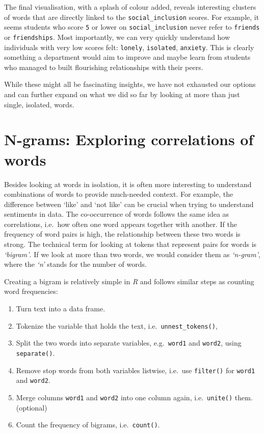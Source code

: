 \documentclass[
  letterpaper,
]{krantz}
\providecommand{\tightlist}{%
  \setlength{\itemsep}{0pt}\setlength{\parskip}{0pt}}\usepackage{longtable,booktabs,array}
\begin{document}
The final visualisation, with a splash of colour added, reveals
interesting clusters of words that are directly linked to the
\texttt{social\_inclusion} scores. For example, it seems students who
score \texttt{5} or lower on \texttt{social\_inclusion} never refer to
\texttt{friends} or \texttt{friendships}. Most importantly, we can very
quickly understand how individuals with very low scores felt:
\texttt{lonely}, \texttt{isolated}, \texttt{anxiety}. This is clearly
something a department would aim to improve and maybe learn from
students who managed to built flourishing relationships with their
peers.

While these might all be fascinating insights, we have not exhausted our
options and can further expand on what we did so far by looking at more
than just single, isolated, words.

\section{N-grams: Exploring correlations of words}\label{sec-n-grams}

Besides looking at words in isolation, it is often more interesting to
understand combinations of words to provide much-needed context. For
example, the difference between `like' and `not like' can be crucial
when trying to understand sentiments in data. The co-occurrence of words
follows the same idea as correlations, i.e.~how often one word appears
together with another. If the frequency of word pairs is high, the
relationship between these two words is strong. The technical term for
looking at tokens that represent pairs for words is \emph{`bigram'}. If
we look at more than two words, we would consider them as
\emph{`n-gram'}, where the \emph{`n'} stands for the number of words.

Creating a bigram is relatively simple in \emph{R} and follows similar
steps as counting word frequencies:

\begin{enumerate}
\def\labelenumi{\arabic{enumi}.}
\tightlist
\item
  Turn text into a data frame.
\item
  Tokenize the variable that holds the text,
  i.e.~\texttt{unnest\_tokens()},
\item
  Split the two words into separate variables, e.g.~\texttt{word1} and
  \texttt{word2}, using \texttt{separate()}.
\item
  Remove stop words from both variables listwise, i.e.~use
  \texttt{filter()} for \texttt{word1} and \texttt{word2}.
\item
  Merge columns \texttt{word1} and \texttt{word2} into one column again,
  i.e.~\texttt{unite()} them. (optional)
\item
  Count the frequency of bigrams, i.e.~\texttt{count()}.
\end{enumerate}
\end{document}
